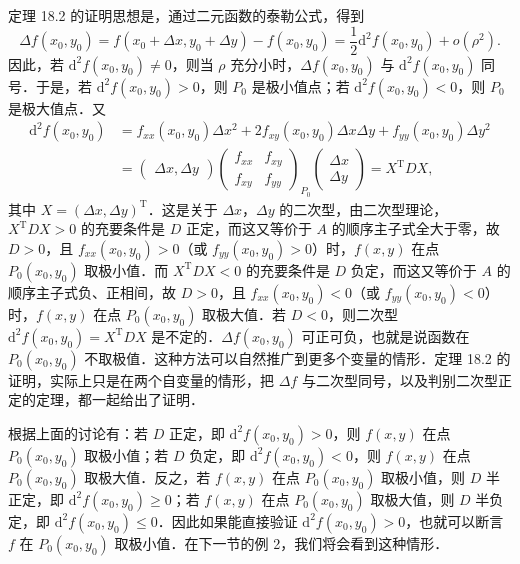 定理 18.2 的证明思想是，通过二元函数的泰勒公式，得到
\[
\Delta f(x_{0},y_{0})=f(x_{0}+\Delta x,y_{0}+\Delta y)-f(x_{0},y_{0})=\frac{1}{2}\mathrm{d}^{2}f(x_{0},y_{0})+o(\rho^{2}).
\]
因此，若 $\mathrm{d}^{2}f(x_{0},y_{0})\neq0$，则当 $\rho$ 充分小时，$\Delta f(x_{0},y_{0})$ 与 $\mathrm{d}^{2}f(x_{0},y_{0})$ 同号．于是，若 $\mathrm{d}^{2}f(x_{0},y_{0})>0$，则 $P_{0}$ 是极小值点；若 $\mathrm{d}^{2}f(x_{0},y_{0})<0$，则 $P_{0}$ 是极大值点．又
\begin{equation}
\begin{aligned}
\mathrm{d}^{2}f(x_{0},y_{0})&=f_{xx}(x_{0},y_{0})\Delta x^{2}+2f_{xy}(x_{0},y_{0})\Delta x\Delta y+f_{yy}(x_{0},y_{0})\Delta y^{2}\\
&=\begin{pmatrix}\Delta x,\Delta y\end{pmatrix}
\begin{pmatrix}f_{xx}&f_{xy}\\ f_{xy}&f_{yy}\end{pmatrix}_{P_{0}}
\begin{pmatrix}\Delta x\\ \Delta y\end{pmatrix}=X^{\mathrm{T}}DX,
\end{aligned}
\tag{4}
\end{equation}
其中 $X=(\Delta x,\Delta y)^{\mathrm{T}}$．这是关于 $\Delta x$，$\Delta y$ 的二次型，由二次型理论，$X^{\mathrm{T}}DX>0$ 的充要条件是 $D$ 正定，而这又等价于 $A$ 的顺序主子式全大于零，故 $D>0$，且 $f_{xx}(x_{0},y_{0})>0$（或 $f_{yy}(x_{0},y_{0})>0$）时，$f(x,y)$ 在点 $P_{0}(x_{0},y_{0})$ 取极小值．而 $X^{\mathrm{T}}DX<0$ 的充要条件是 $D$ 负定，而这又等价于 $A$ 的顺序主子式负、正相间，故 $D>0$，且 $f_{xx}(x_{0},y_{0})<0$（或 $f_{yy}(x_{0},y_{0})<0$）时，$f(x,y)$ 在点 $P_{0}(x_{0},y_{0})$ 取极大值．若 $D<0$，则二次型 $\mathrm{d}^{2}f(x_{0},y_{0})=X^{\mathrm{T}}DX$ 是不定的．$\Delta f(x_{0},y_{0})$ 可正可负，也就是说函数在 $P_{0}(x_{0},y_{0})$ 不取极值．这种方法可以自然推广到更多个变量的情形．定理 18.2 的证明，实际上只是在两个自变量的情形，把 $\Delta f$ 与二次型同号，以及判别二次型正定的定理，都一起给出了证明．

根据上面的讨论有：若 $D$ 正定，即 $\mathrm{d}^{2}f(x_{0},y_{0})>0$，则 $f(x,y)$ 在点 $P_{0}(x_{0},y_{0})$ 取极小值；若 $D$ 负定，即 $\mathrm{d}^{2}f(x_{0},y_{0})<0$，则 $f(x,y)$ 在点 $P_{0}(x_{0},y_{0})$ 取极大值．反之，若 $f(x,y)$ 在点 $P_{0}(x_{0},y_{0})$ 取极小值，则 $D$ 半正定，即 $\mathrm{d}^{2}f(x_{0},y_{0})\geqslant0$；若 $f(x,y)$ 在点 $P_{0}(x_{0},y_{0})$ 取极大值，则 $D$ 半负定，即 $\mathrm{d}^{2}f(x_{0},y_{0})\leqslant0$．因此如果能直接验证 $\mathrm{d}^{2}f(x_{0},y_{0})>0$，也就可以断言 $f$ 在 $P_{0}(x_{0},y_{0})$ 取极小值．在下一节的例 2，我们将会看到这种情形．

